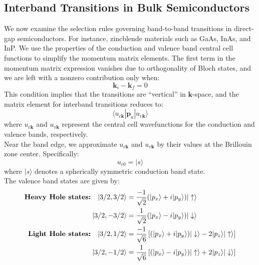 \subsection{Interband Transitions in Bulk Semiconductors}
We now examine the selection rules governing band-to-band transitions in direct-gap semiconductors. For instance, zincblende materials such as GaAs, InAs, and InP. We use the properties of the conduction and valence band central cell functions to simplify the momentum matrix elements. The first term in the momentum matrix expression vanishes due to orthogonality of Bloch states, and we are left with a nonzero contribution only when:
\begin{equation}
	\mathbf{k}_i - \mathbf{k}_f = 0
\end{equation}
This condition implies that the transitions are “vertical” in \( \mathbf{k} \)-space, and the matrix element for interband transitions reduces to:
\begin{equation}
	\langle u_{c\mathbf{k}} | \mathbf{p}_a | u_{v\mathbf{k}} \rangle
\end{equation}
where \( u_{c\mathbf{k}} \) and \( u_{v\mathbf{k}} \) represent the central cell wavefunctions for the conduction and valence bands, respectively.\\
Near the band edge, we approximate \( u_{c\mathbf{k}} \) and \( u_{v\mathbf{k}} \) by their values at the Brillouin zone center. Specifically:
\begin{equation}
	u_{c0} = |s\rangle
\end{equation}
where \( |s\rangle \) denotes a spherically symmetric conduction band state.\\
The valence band states are given by:
\begin{align}
	\text{\textbf{Heavy Hole states:}} \quad |3/2, 3/2\rangle & = \frac{-1}{\sqrt{2}} (|p_x\rangle + i |p_y\rangle) |\uparrow\rangle                                                   \\
	|3/2, -3/2\rangle                                         & = \frac{1}{\sqrt{2}} (|p_x\rangle - i |p_y\rangle) |\downarrow\rangle                                                  \\
	\text{\textbf{Light Hole states:}}\quad |3/2, 1/2\rangle  & = \frac{-1}{\sqrt{6}} \left[ (|p_x\rangle + i |p_y\rangle) |\downarrow\rangle - 2 |p_z\rangle |\uparrow\rangle \right] \\
	|3/2, -1/2\rangle                                         & = \frac{1}{\sqrt{6}} \left[ (|p_x\rangle - i |p_y\rangle) |\uparrow\rangle + 2 |p_z\rangle |\downarrow\rangle \right]
\end{align}

